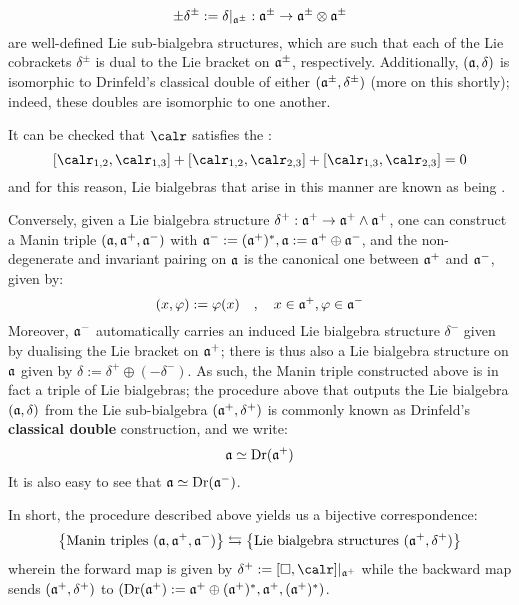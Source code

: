             $$\pm \delta^{\pm} := \delta|_{\a^{\pm}}: \a^{\pm} \to \a^{\pm} \tensor \a^{\pm}$$
        are well-defined Lie sub-bialgebra structures, which are such that each of the Lie cobrackets $\delta^{\pm}$ is dual to the Lie bracket on $\mathfrak{a}^{\pm}$, respectively. Additionally, $(\mathfrak{a}, \delta)$ is isomorphic to Drinfeld's classical double of either $(\mathfrak{a}^{\pm}, \delta^{\pm})$ (more on this shortly); indeed, these doubles are isomorphic to one another.
        \begin{remark}
            It can be checked that $\calr$ satisfies the :
                \begin{equation} \label{equation: CYBE}
                    [\calr_{1, 2}, \calr_{1, 3}] + [\calr_{1, 2}, \calr_{2, 3}] + [\calr_{1, 3}, \calr_{2, 3}] = 0
                \end{equation}
            and for this reason, Lie bialgebras that arise in this manner are known as being .
        \end{remark}
        
        Conversely, given a Lie bialgebra structure $\delta^+: \mathfrak{a}^+ \to \mathfrak{a}^+ \wedge \mathfrak{a}^+$, one can construct a Manin triple $(\mathfrak{a}, \mathfrak{a}^+, \mathfrak{a}^-)$ with $\mathfrak{a}^- := (\mathfrak{a}^+)^*, \mathfrak{a} := \mathfrak{a}^+ \oplus \mathfrak{a}^-$, and the non-degenerate and invariant pairing on $\mathfrak{a}$ is the canonical one between $\mathfrak{a}^+$ and $\mathfrak{a}^-$, given by:
            $$(x, \varphi) := \varphi(x) \quad, \quad x \in \mathfrak{a}^+, \varphi \in \mathfrak{a}^-$$
        Moreover, $\mathfrak{a}^-$ automatically carries an induced Lie bialgebra structure $\delta^-$ given by dualising the Lie bracket on $\mathfrak{a}^+$; there is thus also a Lie bialgebra structure on $\mathfrak{a}$ given by $\delta := \delta^+ \oplus (-\delta^-)$. As such, the Manin triple constructed above is in fact a triple of Lie bialgebras; the procedure above that outputs the Lie bialgebra $(\mathfrak{a}, \delta)$ from the Lie sub-bialgebra $(\mathfrak{a}^+, \delta^+)$ is commonly known as Drinfeld's \textbf{classical double} construction, and we write:
            $$\mathfrak{a} \simeq \operatorname{Dr}(\mathfrak{a}^+)$$
        It is also easy to see that $\mathfrak{a} \simeq \operatorname{Dr}(\mathfrak{a}^-)$.

        In short, the procedure described above yields us a bijective correspondence:
            \begin{equation} \label{equation: manin_triple_lie_bialgebra_correspondence}
                \left\{ \text{Manin triples $(\mathfrak{a}, \mathfrak{a}^+, \mathfrak{a}^-)$} \right\} \leftrightarrows \left\{ \text{Lie bialgebra structures $(\mathfrak{a}^+, \delta^+)$} \right\}
            \end{equation}
        wherein the forward map is given by $\delta^+ := [\Box, \calr]|_{\a^+}$ while the backward map sends $(\mathfrak{a}^+, \delta^+)$ to $(\operatorname{Dr}(\mathfrak{a}^+) := \mathfrak{a}^+ \oplus (\mathfrak{a}^+)^*, \mathfrak{a}^+, (\mathfrak{a}^+)^*)$.

